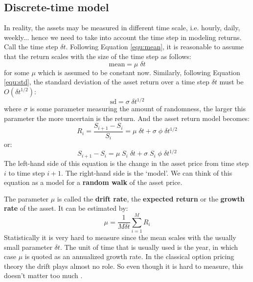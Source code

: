 \subsection{Discrete-time model}
In reality, the assets may be measured in different time scale, i.e. hourly, daily, weekly... hence we need to take into account the time step in modeling returns. Call the time step $\delta t$. Following Equation \ref{equ:mean}, it is reasonable to assume that the return scales with the size of the time step as follows:
\begin{equation}
    \text{mean} = \mu \; \delta t
\end{equation}
for some $\mu$ which is assumed to be constant now. Similarly, following Equation \ref{equ:std}, the standard deviation of the asset return over a time step $\delta t$ must be $O \left( \delta t^{1/2} \right)$:
\begin{equation}
    \text{sd} = \sigma \; \delta t^{1/2}
\end{equation}
where $\sigma$ is some parameter measuring the amount of randomness, the larger this parameter the more uncertain is the return. And the asset return model becomes:
\begin{equation}
    R_i = \frac{S_{i+1} - S_i}{S_i} = \mu \; \delta t + \sigma \; \phi \; \delta t^{1/2}
\end{equation}
or:
\begin{equation}
    S_{i+1} - S_i = \mu \; S_i \; \delta t + \sigma \; S_i \; \phi \; \delta t^{1/2} 
\end{equation}   
The left-hand side of this equation is the change in the asset price from time step $i$ to time step $i+1$. The right-hand side is the `model'. We can think of this equation as a model for a \textbf{random walk} of the asset price.

The parameter $\mu$ is called the \textbf{drift rate}, the \textbf{expected return} or the \textbf{growth rate} of the asset. It can be estimated by:
\begin{equation}
    \mu = \frac{1}{M \delta t} \sum_{i = 1}^{M} R_i
    \label{equ:drift}
\end{equation}
Statistically it is very hard to measure since the mean scales with the usually small parameter $\delta t$. The unit of time that is usually used is the year, in which case $\mu$ is quoted as an annualized growth rate. In the classical option pricing theory the drift plays almost no role. So even though it is hard to measure, this doesn't matter too much \cite{pw_iqf2ed_2007}.

